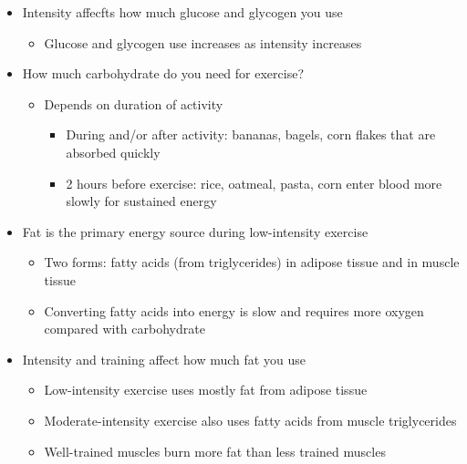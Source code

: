 \documentclass[12pt]{article}
\begin{document}
\begin{itemize}
\begin{itemize}
\begin{itemize}
                            \end{itemize}
                    \end{itemize}
                \item Intensity affecfts how much glucose and glycogen you use
                    \begin{itemize}
                        \item Glucose and glycogen use increases as intensity increases
                    \end{itemize}
                \item How much carbohydrate do you need for exercise?
                    \begin{itemize}
                        \item Depends on duration of activity
                            \begin{itemize}
                                \item During and/or after activity: bananas, bagels, corn flakes that are absorbed quickly
                                \item 2 hours before exercise: rice, oatmeal, pasta, corn enter blood more slowly for sustained energy
                            \end{itemize}
                    \end{itemize}
                \item Fat is the primary energy source during low-intensity exercise
                    \begin{itemize}
                        \item Two forms: fatty acids (from triglycerides) in adipose tissue and in muscle tissue
                        \item Converting fatty acids into energy is slow and requires more oxygen compared with carbohydrate
                    \end{itemize}
                \item Intensity and training affect how much fat you use
                    \begin{itemize}
                        \item Low-intensity exercise uses mostly fat from adipose tissue
                        \item Moderate-intensity exercise also uses fatty acids from muscle triglycerides
                        \item Well-trained muscles burn more fat than less trained muscles

\end{itemize}
\end{itemize}
\end{document}
